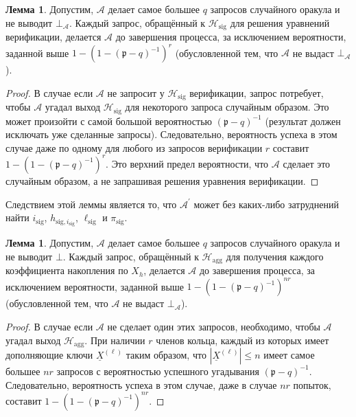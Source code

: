 \documentclass{mrl}
\theoremstyle{definition}
\numberwithin{theorem}{subsection}
\newtheorem{lemma}[theorem]{Лемма}
\newcommand{\adversary}{\mathcal{A}}
\newcommand{\p}{\mathfrak{p}}
\begin{document}


\begin{lemma}
Допустим, $\adversary$ делает самое большее $q$ запросов случайного оракула и не выводит $\bot_\adversary$. Каждый запрос, обращённый к $\mathcal{H}_{\text{sig}}$ для решения уравнений верификации, делается $\adversary$ до завершения процесса, за исключением вероятности, заданной выше $1 - (1-(\p - q)^{-1})^{r}$ (обусловленной тем, что $\adversary$ не выдаст $\bot_\adversary$).
\end{lemma}
\begin{proof}
В случае если $\adversary$ не запросит у $\mathcal{H}_{\text{sig}}$ верификации, запрос потребует, чтобы $\adversary$ угадал выход $\mathcal{H}_{\text{sig}}$ для некоторого запроса случайным образом. Это может произойти с самой большой вероятностью $(\p - q)^{-1}$ (результат должен исключать уже сделанные запросы). Следовательно, вероятность успеха в этом случае даже по одному для любого из запросов верификации $r$ составит $1 - (1 - (\p - q)^{-1})^{r}$. Это верхний предел вероятности, что $\adversary$ сделает это случайным образом, а не запрашивая решения уравнения верификации.
\end{proof}

Следствием этой леммы является то, что $\adversary^\prime$ может без каких-либо затруднений найти $i_{\text{sig}}$, $h_{\text{sig}, i_{\text{sig}}}$, $\ell_{\text{sig}}$ и $\pi_{\text{sig}}$.

\begin{lemma}
Допустим, $\adversary$ делает самое большее $q$ запросов случайного оракула и не выводит $\bot$. Каждый запрос, обращённый к $\mathcal{H}_{\text{agg}}$ для получения каждого коэффициента накопления по $X_h$, делается $\adversary$ до завершения процесса, за исключением вероятности, заданной выше $1 - (1- (\p - q)^{-1})^{nr}$ (обусловленной тем, что $\adversary$ не выдаст $\bot_\adversary$).
\end{lemma}
\begin{proof}
В случае если $\adversary$ не сделает один этих запросов, необходимо, чтобы $\adversary$ угадал выход $\mathcal{H}_{\text{agg}}$. При наличии $r$ членов кольца, каждый из которых имеет дополняющие ключи $\underline{X}^{(\ell)}$ таким образом, что $\left|\underline{X}^{(\ell)}\right| \leq n$ имеет самое большее $nr$ запросов с вероятностью успешного угадывания $(\p - q)^{-1}$. Следовательно, вероятность успеха в этом случае, даже в случае $nr$ попыток, составит $1 - (1- (\p - q)^{-1})^{nr}$.
\end{proof}
\end{document}
